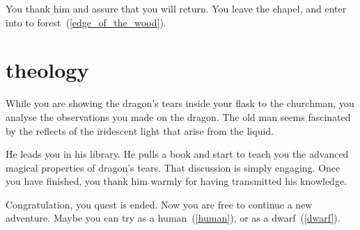 You thank him and assure that you will return. You leave the chapel, and enter
into to forest~(\ref{edge_of_the_wood}).

\section{theology}

While you are showing the dragon's tears inside your flask to the churchman, you
analyse the observations you made on the dragon. The old man seems fascinated by
the reflects of the iridescent light that arise from the liquid.

He leads you in his library. He pulls a book and start to teach you the advanced
magical properties of dragon's tears. That discussion is simply engaging.
Once you have finished, you thank him warmly for having transmitted his
knowledge.

Congratulation, you quest is ended. Now you are free to continue a new
adventure. Maybe you can try as a human~(\ref{human}), or as a
dwarf~(\ref{dwarf}).
